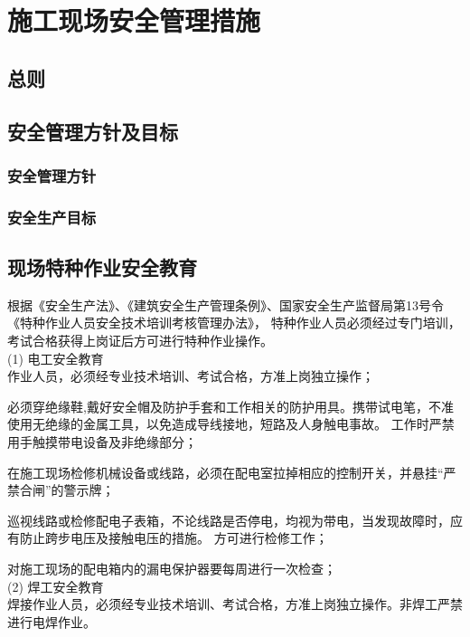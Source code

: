 \section{施工现场安全管理措施}
\subsection{总则}

\subsection{安全管理方针及目标}
\subsubsection{安全管理方针}

\subsubsection{安全生产目标}

\subsection{现场特种作业安全教育}

根据《安全生产法》、《建筑安全生产管理条例》、国家安全生产监督局第13号令《特种作业人员安全技术培训考核管理办法》，
特种作业人员必须经过专门培训，考试合格获得上岗证后方可进行特种作业操作。\\

(1) 电工安全教育\\

 作业人员，必须经专业技术培训、考试合格，方准上岗独立操作；

 必须穿绝缘鞋,戴好安全帽及防护手套和工作相关的防护用具。携带试电笔，不准使用无绝缘的金属工具，以免造成导线接地，短路及人身触电事故。
工作时严禁用手触摸带电设备及非绝缘部分；

 在施工现场检修机械设备或线路，必须在配电室拉掉相应的控制开关，并悬挂“严禁合闸”的警示牌；

 巡视线路或检修配电子表箱，不论线路是否停电，均视为带电，当发现故障时，应有防止跨步电压及接触电压的措施。
方可进行检修工作；

 对施工现场的配电箱内的漏电保护器要每周进行一次检查；\\


(2) 焊工安全教育\\

 焊接作业人员，必须经专业技术培训、考试合格，方准上岗独立操作。非焊工严禁进行电焊作业。

